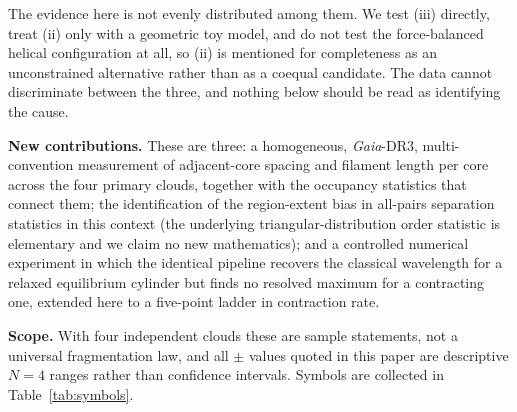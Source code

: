 \documentclass[usenatbib,twoside,twocolumn]{mnras}
\begin{document}
The evidence here is not evenly distributed among them. We test (iii) directly, treat (ii) only with a geometric toy model, and do not test the force-balanced helical configuration at all, so (ii) is mentioned for completeness as an unconstrained alternative rather than as a coequal candidate. The data cannot discriminate between the three, and nothing below should be read as identifying the cause.

\smallskip\noindent\textbf{New contributions.} These are three: a homogeneous, \textit{Gaia}-DR3, multi-convention measurement of adjacent-core spacing and filament length per core across the four primary clouds, together with the occupancy statistics that connect them; the identification of the region-extent bias in all-pairs separation statistics in this context (the underlying triangular-distribution order statistic is elementary and we claim no new mathematics); and a controlled numerical experiment in which the identical pipeline recovers the classical wavelength for a relaxed equilibrium cylinder but finds no resolved maximum for a contracting one, extended here to a five-point ladder in contraction rate.

\smallskip\noindent\textbf{Scope.} With four independent clouds these are sample statements, not a universal fragmentation law, and all $\pm$ values quoted in this paper are descriptive $N=4$ ranges rather than confidence intervals. Symbols are collected in Table~\ref{tab:symbols}.
\end{document}
